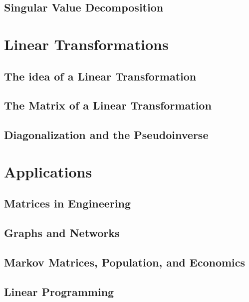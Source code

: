 \documentclass{book}
\begin{document}
\section{Singular Value Decomposition}








\chapter{Linear Transformations}
\section{The idea of a Linear Transformation}

\section{The Matrix of a Linear Transformation}

\section{Diagonalization and the Pseudoinverse}









\chapter{Applications}
\section{Matrices in Engineering}

\section{Graphs and Networks}

\section{Markov Matrices, Population, and Economics}

\section{Linear Programming}
\end{document}
